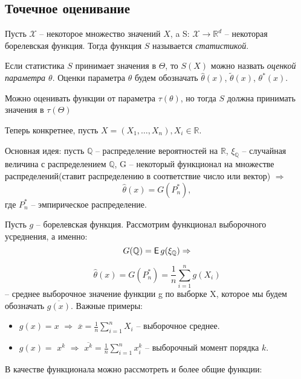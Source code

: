 \subsection{Точечное оценивание}

\begin{definition}
Пусть $\mathcal{X}$ -- некоторое множество значений \(X\), a S: $\mathcal{X} \to \mathbb{R}^{d}$ -- некоторая борелевская функция. Тогда функция \(S\) называется \emph{статистикой}. 
\end{definition}

\begin{definition}
Если статистика \(S\) принимает значения в $\Theta$, то \(S(X)\) можно назвать \emph{оценкой параметра $\theta$}. Оценки параметра $\theta$ будем обозначать $\hat{\theta}(x)$, $\tilde{\theta}(x)$, $\theta^{*}(x)$.
\end{definition}

\begin{remark}
Можно оценивать функции от параметра $\tau(\theta)$, но тогда \(S\) должна принимать значения в $\tau(\Theta)$
\end{remark}
Теперь конкретнее, пусть \(X = (X_1, \ldots, X_n), X_i \in \mathbb{R}\).

Основная идея: пусть $\mathbb{Q}$ -- распределение вероятностей на $\mathbb{R}$, $\xi_{\mathbb{Q}}$ -- случайная величина с распределением $\mathbb{Q}$, G -- некоторый функционал на множестве распределений(ставит распределению в соответствие число или вектор) $\Rightarrow$ 
$$\hat{\theta}(x) = G(P^{*}_n),$$где $P^{*}_n$ -- эмпирическое распределение.

\begin{example}
Пусть \(g\) -- борелевская функция. Рассмотрим функционал выборочного усреднения, а именно:
$$
G(\mathbb{Q}) = \E g(\xi_{\mathbb{Q}}) \Rightarrow
$$

$$
\hat{\theta}(x) = G(P^{*}_n) = \frac{1}{n}\sum_{i = 1}^{n}g(X_i)
$$
-- среднее выборочное значение функции g по выборке X, которое мы будем обозначать $\overline{g(x)}$. Важные примеры:\\
\begin{itemize}
    \item \(g(x) = x\) $\Rightarrow$ $\overline{x} = \frac{1}{n}\sum\limits_{i = 1}^{n}X_i$ -- выборочное среднее.
    \item \(g(x) =\) $x^{k}$ $\Rightarrow$ $\overline{x^k} = \frac{1}{n}\sum\limits_{i = 1}^{n}x^k_i$ -- выборочный момент порядка \(k\).
\end{itemize}
\end{example}
В качестве функционала можно рассмотреть и более общие функции:

